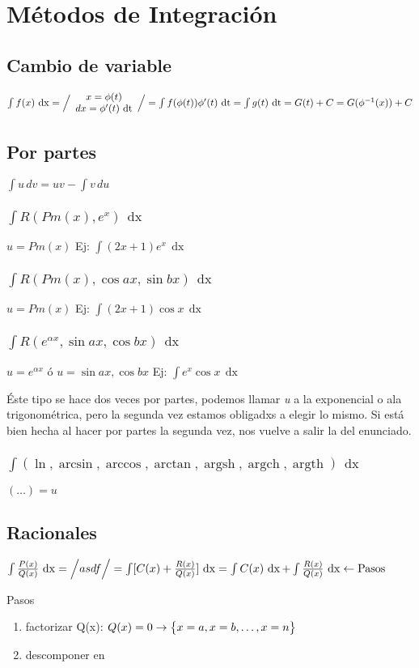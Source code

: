 \documentclass[a4paper,11pt]{article}
\DeclareMathOperator{\xder}{\, \mathrm{d}x}
\DeclareMathOperator{\tder}{\, \mathrm{d}t}
\DeclareMathOperator{\argsh}{argsh}
\DeclareMathOperator{\argch}{argch}
\DeclareMathOperator{\argth}{argth}
\begin{document}
	\section{Métodos de Integración}
		\subsection{Cambio de variable}
			$ \int f(x) \xder = \Big{/}
				\begin{array}{c}
					x = \phi (t) \\
					dx = \phi'(t) \tder
				\end{array}
				\Big{/}
				= \int f(\phi(t)) \phi' (t) \tder =
				\int g(t) \tder = G (t) + C = G (\phi^{-1} (x)) + C
			$
		\subsection{Por partes}
			$ \int u \, dv = uv - \int v \, du $

			\subsubsection{$ \int R (Pm(x), e^x) \xder$}
				$ u = Pm(x) $ \quad 
				Ej: $ \int (2x + 1) e^x \xder $
			\subsubsection{$ \int R (Pm(x), \cos ax, \sin bx) \xder $}
				$ u = Pm(x) $ \quad
				Ej: $ \int (2x + 1) \cos x \xder $
			\subsubsection{$ \int R (e^{\alpha x}, \sin ax, \cos bx) \xder $}
				$ u = e^{\alpha x} $ ó $ u = \sin ax, \cos bx $ \quad
				Ej: $ \int e^x \cos x \xder $

				Éste tipo se hace dos veces por partes, podemos llamar 
				\textit{u} a la exponencial o ala trigonométrica, pero la
				segunda vez estamos obligadxs a elegir lo mismo. Si está bien
				hecha al hacer por partes la segunda vez, nos vuelve a salir
				la del enunciado.
			\subsubsection{$ \int (\ln, \arcsin, \arccos, \arctan, \argsh, \argch, \argth ) \xder $}
				$ ( \dots ) = u $
		\subsection{Racionales}
			$ \int \frac{P(x)}{Q(x)} \xder =
				\Big{/}
					asdf
				\Big{/}
				= \int [ C(x) + \frac{R(x)}{Q(x)} ] \xder =
				\int C(x) \xder + \int \frac{R(x)}{Q(x)} \xder \leftarrow \text{Pasos} $

				Pasos
			\begin{enumerate}
				\item factorizar Q(x): $ Q(x) = 0 \rightarrow
					\big{ \{ } 
						x = a, 
						x = b, 
						\dots,
						x = n 
					\big{ \} } $
				\item descomponer en 
			\end{enumerate}
\end{document}
